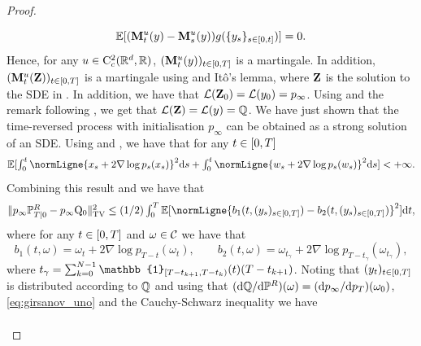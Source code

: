 \begin{proof}
\begin{enumerate}[wide, labelwidth=!, labelindent=0pt, label=(\alph*)]
\begin{equation}
        \mathbb{E} [ (\mathbf{M}_t^u(y) - \mathbf{M}_s^u(y)) g(\{y_s\}_{s \in \left[0,t\right]}) ] = 0 .
      \end{equation}
      Hence, for any $u \in \mathrm{C}^2_c(\mathbb{R}^d, \mathbb{R})$,
      $(\mathbf{M}_t^u(y))_{t \in \left[0,T\right]}$ is a martingale. In addition,
      $(\mathbf{M}_t^u(\mathbf{Z}))_{t \in \left[0,T\right]}$ is a martingale using
       and It\^o's lemma, where $\mathbf{Z}$ is
      the solution to the SDE in . In
      addition, we have that
      $\mathcal{L}(\mathbf{Z}_0) = \mathcal{L}(y_0) = p_\infty$. Using
       and the remark following \cite[Hypothesis
      1.8]{cattiaux2021time}, we get that
      $\mathcal{L}(\mathbf{Z}) = \mathcal{L}(y) = \mathbb{Q}$. We have just shown that the
      time-reversed process with initialisation $p_\infty$ can be obtained as a
      strong solution of an SDE.  Using  and
      , we have that for any
      $t \in \left[0,T\right]$
      \begin{equation}
        \textstyle{\expeLigne{\int_0^t \normLigne{x_s + 2\nabla \log p_s(x_s)}^2 \rmd s + \int_0^t \normLigne{w_s + 2\nabla \log p_s(w_s)}^2 \rmd s}<+\infty.}
      \end{equation}
      Combining this result and \cite[Lemma S13]{debortoli2021diffusion} we have
      that
      \begin{equation}
        \label{eq:girsanov_uno}
    \textstyle{
    \tvnormLigne{p_\infty \Pbb^R_{T|0} - p_\infty \Qker_0}^2  \leq  (1/2) \int_0^T \expeLigne{\normLigne{b_1(t, (y_s)_{s \in \ccint{0,T}}) - b_2(t, (y_s)_{s \in \ccint{0,T}})}^2} \rmd t  ,}
  \end{equation}
      where for any $t \in \left[0,T\right]$ and $\omega \in \mathcal{C}$ we have that
      \begin{equation}
        b_1(t, \omega) = \omega_t + 2\nabla \log p_{T-t}(\omega_t)  , \qquad b_2(t, \omega) = \omega_{t_\gamma} + 2\nabla \log p_{T- t_\gamma}(\omega_{t_\gamma})  ,
      \end{equation}
      where
      $t_\gamma = \sum_{k=0}^{N-1} \mathbb{1}_{\coint{T - t_{k+1}, T -
          t_{k}}}(t) (T - t_{k+1})$. Noting that $(y_t)_{t \in \left[0,T\right]}$
      is distributed according to $\mathbb{Q}$ and using that
      $(\mathrm{d} \mathbb{Q} / \mathrm{d} \mathbb{P}^R)(\omega) = (\mathrm{d} p_\infty / \mathrm{d}
      p_T)(\omega_0)$, \eqref{eq:girsanov_uno} and the Cauchy-Schwarz
      inequality we have
      \begin{align}
        \label{eq:pinsker_girsanov}

\end{align}
\end{enumerate}
\end{proof}
